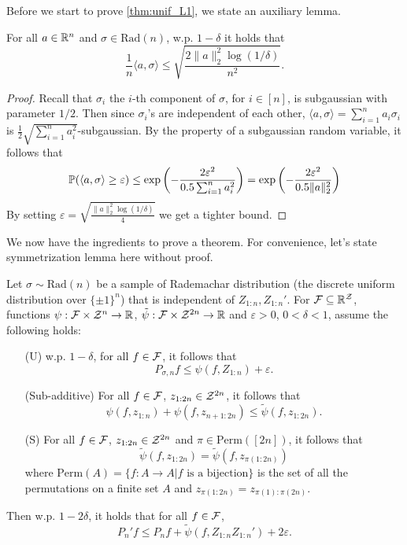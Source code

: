 \documentclass[twoside]{article}
\begin{document}
Before we start to prove \cref{thm:unif_L1}, we state an auxiliary lemma.
\begin{lemma}\label{lem:aux_lem}
    For all $a\in \mathbb{R}^n$ and $\sigma\in \mathrm{Rad}(n)$, w.p. $1-\delta$ it holds that
    \begin{equation*}
        \frac{1}{n}\langle a,\sigma\rangle\le \sqrt{\frac{2\|a\|_2^2 \log(1/\delta)}{n^2}}.
    \end{equation*}
\end{lemma}
\begin{proof}
    Recall that $\sigma_i$ the $i$-th component of $\sigma$, for $i\in [n]$, is subgaussian with parameter $1/2$. Then since $\sigma_i$'s are independent of each other, $\langle a, \sigma\rangle = \sum_{i=1}^n a_i\sigma_i$ is $\frac{1}{2}\sqrt{\sum_{i=1}^n a_i^2}$-subgaussian. By the property of a subgaussian random variable, it follows that
    \begin{align*}
        \mathbb{P}(\langle a, \sigma\rangle \ge \varepsilon)\le \exp\left(-\frac{2\varepsilon^2}{0.5\sum_{i=1}^n a_i^2}\right)=\exp\left(-\frac{2\varepsilon^2}{0.5\|a\|_2^2}\right)
    \end{align*}
    By setting $\varepsilon=\sqrt{\frac{\|a\|_2^2\log(1/\delta)}{4}}$ we get a tighter bound.
\end{proof}
We now have the ingredients to prove a theorem. For convenience, let's state symmetrization lemma here without proof.
\begin{proposition}\label{thm:sym_lem}
    Let $\sigma\sim \mathrm{Rad}(n)$ be a sample of Rademachar distribution (the discrete uniform distribution over $\{\pm 1\}^n$) that is independent of $Z_{1:n}, Z_{1:n}'$. For $\mathcal{F}\subseteq \mathbb{R}^{\mathcal{Z}}$, functions $\psi:\mathcal{F}\times \mathcal{Z}^n\to \mathbb{R}$, $\tilde \psi:\mathcal{F}\times \mathcal{Z}^{2n}\to\mathbb{R}$ and $\varepsilon>0$, $0<\delta<1$, assume the following holds:
    \begin{enumerate}
       \item[(U)] w.p. $1-\delta$, for all $f\in \mathcal{F}$, it follows that \[P_{\sigma,n}f\le \psi(f,Z_{1:n})+\varepsilon.\]
       \item[(Sub-additive)] For all $f\in \mathcal{F}$, $z_{1:2n}\in \mathcal{Z}^{2n}$, it follows that \[\psi(f,z_{1:n})+\psi(f,z_{n+1:2n})\le \tilde\psi(f,z_{1:2n}).\]
       \item[(S)] For all $f\in \mathcal{F}$, $z_{1:2n}\in \mathcal{Z}^{2n}$ and $\pi\in \mathrm{Perm}([2n])$, it follows that
       \[\tilde \psi(f,z_{1:2n})=\tilde \psi(f,z_{\pi(1:2n)})\]
       where $\mathrm{Perm}(A)=\{f:A\to A\vert f \text{ is a bijection}\}$ is the set of all the permutations on a finite set $A$ and $z_{\pi(1:2n)}=z_{\pi(1):\pi(2n)}$.
    \end{enumerate}
    Then w.p. $1-2\delta$, it holds that for all $f\in \mathcal{F}$,
    \begin{equation*}
       P_n'f\le P_nf+\tilde\psi(f,Z_{1:n}Z_{1:n}')+2\varepsilon.
    \end{equation*}
 \end{proposition}
\end{document}
